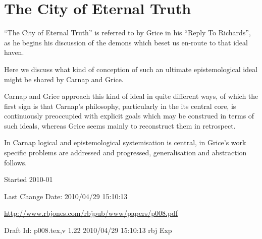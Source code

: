 \documentclass[10pt,titlepage]{book}
\begin{document}
\chapter{The City of Eternal Truth}

``The City of Eternal Truth'' is referred to by Grice in his ``Reply To Richards''\cite{grice86b}, as he begins his discussion of the demons which beset us en-route to that ideal haven.

Here we discuss what kind of conception of such an ultimate epistemological ideal might be shared by Carnap and Grice.

Carnap and Grice approach this kind of ideal in quite different ways, of which the first sign is that Carnap's philosophy, particularly in the its central core, is continuously preoccupied with explicit goals which may be construed in terms of such ideals, whereas Grice seems mainly to reconstruct them in retrospect.

In Carnap logical and epistemological systemisation is central, in Grice's work specific problems are addressed and progressed, generalisation and abstraction follows.



\backmatter

%




\label{index}
{\twocolumn[]
{\small\printindex}}

\vfill

\tiny{
Started 2010-01

Last Change $ $Date: 2010/04/29 15:10:13 $ $

\href{http://www.rbjones.com/rbjpub/www/papers/p008.pdf}{http://www.rbjones.com/rbjpub/www/papers/p008.pdf}

Draft $ $Id: p008.tex,v 1.22 2010/04/29 15:10:13 rbj Exp $ $
}%
\end{document}
